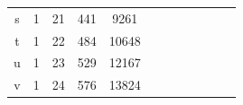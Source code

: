 \documentclass[review,12pt]{elsarticle}
\begin{document}
\begin{table}[htbp!]
\begin{tabular}{cccccccccccc}
\multicolumn{1}{|c|}{s}                  & \multicolumn{1}{c|}{1} & \multicolumn{1}{c|}{21} & \multicolumn{1}{c|}{441} & \multicolumn{1}{c|}{9261}  &                            &                            &                            &                            &                           &                            &                            \\ \cline{1-5}
\multicolumn{1}{|c|}{t}                  & \multicolumn{1}{c|}{1} & \multicolumn{1}{c|}{22} & \multicolumn{1}{c|}{484} & \multicolumn{1}{c|}{10648} &                            &                            &                            &                            &                           &                            &                            \\ \cline{1-5}
\multicolumn{1}{|c|}{u}                  & \multicolumn{1}{c|}{1} & \multicolumn{1}{c|}{23} & \multicolumn{1}{c|}{529} & \multicolumn{1}{c|}{12167} &                            &                            &                            &                            &                           &                            &                            \\ \cline{1-5}
\multicolumn{1}{|c|}{v}                  & \multicolumn{1}{c|}{1} & \multicolumn{1}{c|}{24} & \multicolumn{1}{c|}{576} & \multicolumn{1}{c|}{13824} &                            &                            &                            &                            &                           &                            &                            \\ \cline{1-5}
\end{tabular}
\end{table}
\end{document}
